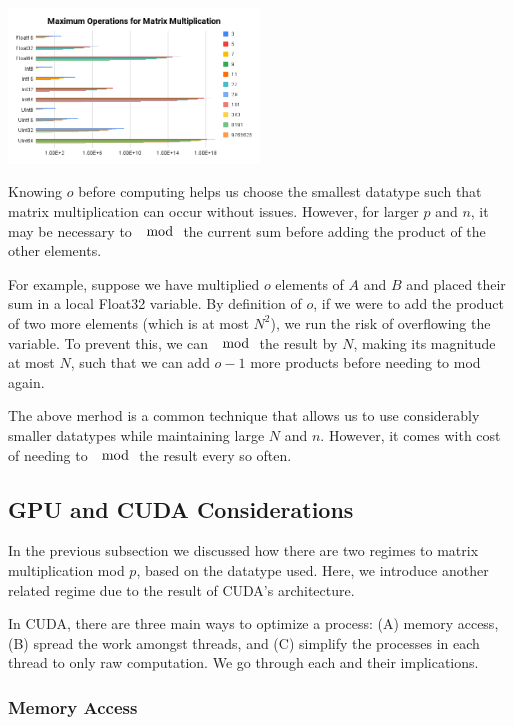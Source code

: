 \begin{center}
\includegraphics*[width=0.5\textwidth]{MatMulMaxOps.png}
\end{center}

Knowing $o$ before computing helps us choose the smallest datatype such that matrix multiplication can occur without issues. However, for larger $p$ and $n$, it may be necessary to $\mod$ the current sum before adding the product of the other elements. 

For example, suppose we have multiplied $o$ elements of $A$ and $B$ and placed their sum in a local Float32 variable. By definition of $o$, if we were to add the product of two more elements (which is at most $N^2$), we run the risk of overflowing the variable. To prevent this, we can $\mod$ the result by $N$, making its magnitude at most $N$, such that we can add $o-1$ more products before needing to mod again.

The above merhod is a common technique that allows us to use considerably smaller datatypes while maintaining large $N$ and $n$. However, it comes with cost of needing to $\mod$ the result every so often.

\subsection{GPU and CUDA Considerations}

In the previous subsection we discussed how there are two regimes to matrix multiplication mod $p$, based on the datatype used. Here, we introduce another related regime due to the result of CUDA's architecture.

In CUDA, there are three main ways to optimize a process: (A) memory access, (B) spread the work amongst threads, and (C) simplify the processes in each thread to only raw computation. We go through each and their implications.

\subsubsection{Memory Access}

